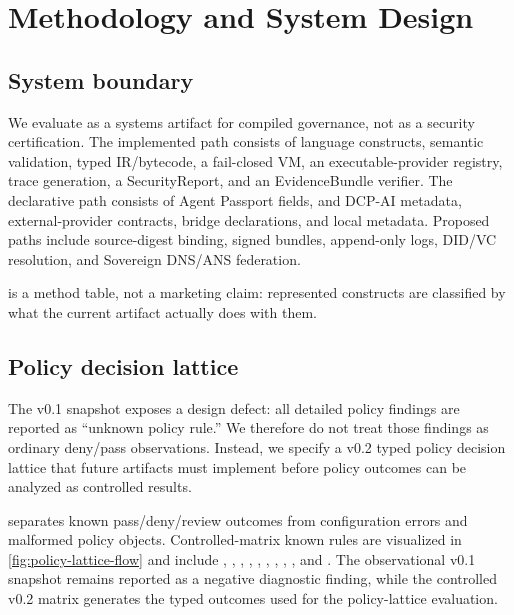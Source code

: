 \section{Methodology and System Design}\label{sec:methodology}

\subsection{System boundary}
We evaluate \Argorix as a systems artifact for compiled governance, not as a
security certification.  The implemented path consists of language constructs,
semantic validation, typed IR/bytecode, a fail-closed VM, an executable-provider
registry, trace generation, a SecurityReport, and an EvidenceBundle verifier.
The declarative path consists of Agent Passport fields, \ATrust and DCP-AI
metadata, external-provider contracts, bridge declarations, and local
 metadata.  Proposed paths include source-digest binding,
signed bundles, append-only logs, DID/VC resolution, and Sovereign DNS/ANS
federation.

\begin{table}[t]
\centering
\caption{Representative construct families and their boundary in the studied
implementation.}
\label{tab:language-constructs}

\end{table}

 is a method table, not a marketing claim:
represented constructs are classified by what the current artifact actually
does with them.

\subsection{Policy decision lattice}
The v0.1 snapshot exposes a design defect: all detailed policy findings are
reported as ``unknown policy rule.''  We therefore do not treat those findings
as ordinary deny/pass observations.  Instead, we specify a v0.2 typed policy
decision lattice that future artifacts must implement before policy outcomes
can be analyzed as controlled results.

\begin{table}[t]
\centering
\caption{Typed policy decision lattice used in the controlled v0.2 matrix.}
\label{tab:policy-lattice}

\end{table}

 separates known pass/deny/review outcomes from
configuration errors and malformed policy objects.  Controlled-matrix known
rules are visualized in \cref{fig:policy-lattice-flow} and include
,
, ,
, ,
, ,
, , and
.  The observational v0.1 snapshot remains
reported as a negative diagnostic finding, while the controlled v0.2 matrix
generates the typed outcomes used for the policy-lattice evaluation.

